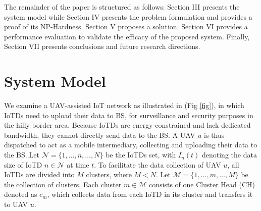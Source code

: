 \documentclass[conference]{IEEEtran}
\begin{document}
\begin{table}[h]
\center
\caption{Summary of related works}\label{RelWork}
\end{table}


The remainder of the paper is structured as follows: Section III presents the system model while Section IV presents the problem formulation and provides a proof of its NP-Hardness. Section V proposes a solution. Section VI provides a performance evaluation to validate the efficacy of the proposed system. Finally, Section VII presents conclusions and future research directions.

\section{System Model}\label{sec:System Model} 

We examine a UAV-assisted IoT network as illustrated in (Fig \ref{fig}), in which IoTDs need to upload their data to BS, for surveillance and security purposes in the hilly border area. Because IoTDs are energy-constrained and lack dedicated bandwidth, they cannot directly send data to the BS. A UAV 
$u$ is thus dispatched to act as a mobile intermediary, collecting and uploading their data to the BS..Let
$\mathcal{N} = \{1, \ldots , n , \ldots , N\}$ be the IoTDs set, with $I_n(t)$ denoting the data size of IoTD $n \in \mathcal{N}$ at time $t$. To facilitate the data collection of UAV $u$, all IoTDs are divided into $M$ clusters, where $M < N$. Let $\mathcal{M} = \{1,\ldots, m , \ldots, M\}$ be the collection of clusters. Each cluster $m \in \mathcal{M}$ consists of one Cluster Head (CH) denoted as $c_m$, which collects data from each IoTD in its cluster and transfers it to UAV $u$.
\end{document}
